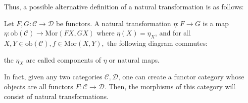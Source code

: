 \documentclass[12pt,reqno]{amsart}
\numberwithin{theorem}{section}
\theoremstyle{definition}
\theoremstyle{remark}
\numberwithin{equation}{section}
\newcommand{\cC}{\mathcal{C}}
\newcommand{\cD}{\mathcal{D}}
\theoremstyle{definition}
\newcommand{\ob}{\mathrm{ob}}
\newcommand{\Mor}{\mathrm{Mor}}
\begin{document}
Thus, a possible alternative definition of a natural transformation is as follows:
\begin{definition}
    Let $F,G:\cC\rightarrow \cD$ be functors. A natural transformation $\eta:F\rightarrow G$ is a map $\eta:\ob(\cC) \rightarrow \Mor(FX,GX)$ where $\eta(X) = \eta_X$, and for all $X,Y \in \ob(\cC),f \in \Mor(X,Y),$ the following diagram commutes:
    \begin{center}
    \end{center}
    the $\eta_X$ are called components of $\eta$ or natural maps.
\end{definition}
In fact, given any two categories $\cC,\cD$, one can create a functor category whose objects are all functors $F:\cC\rightarrow \cD$. Then, the morphisms of this category will consist of natural transformations. 
\end{document}
